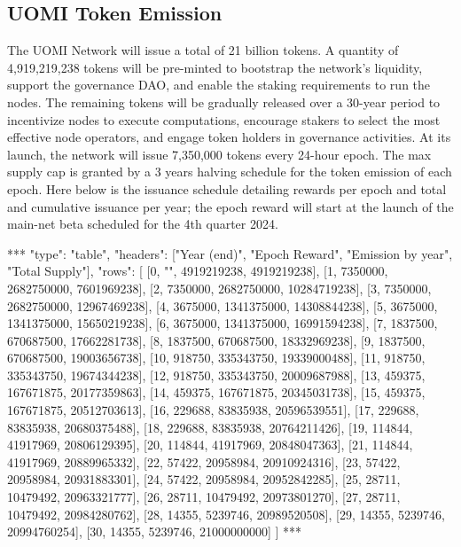 \documentclass{article}
\begin{document}
\subsection{UOMI Token Emission}

The UOMI Network will issue a total of 21 billion tokens. A quantity of 4,919,219,238 tokens will be pre-minted to bootstrap the network’s liquidity, support the governance DAO, and enable the staking requirements to run the nodes. The remaining tokens will be gradually released over a 30-year period to incentivize nodes to execute computations, encourage stakers to select the most effective node operators, and engage token holders in governance activities. At its launch, the network will issue 7,350,000 tokens every 24-hour epoch. The max supply cap is granted by a 3 years halving schedule for the token emission of each epoch. Here below is the issuance schedule detailing rewards per epoch and total and cumulative issuance per year; the epoch reward will start at the launch of the main-net beta scheduled for the 4th quarter 2024.

\begin{center}
***
"type": "table",
"headers": ["Year (end)", "Epoch Reward", "Emission by year", "Total Supply"],
"rows": [
  [0, "", 4919219238, 4919219238],
  [1, 7350000, 2682750000, 7601969238],
  [2, 7350000, 2682750000, 10284719238],
  [3, 7350000, 2682750000, 12967469238],
  [4, 3675000, 1341375000, 14308844238],
  [5, 3675000, 1341375000, 15650219238],
  [6, 3675000, 1341375000, 16991594238],
  [7, 1837500, 670687500, 17662281738],
  [8, 1837500, 670687500, 18332969238],
  [9, 1837500, 670687500, 19003656738],
  [10, 918750, 335343750, 19339000488],
  [11, 918750, 335343750, 19674344238],
  [12, 918750, 335343750, 20009687988],
  [13, 459375, 167671875, 20177359863],
  [14, 459375, 167671875, 20345031738],
  [15, 459375, 167671875, 20512703613],
  [16, 229688, 83835938, 20596539551],
  [17, 229688, 83835938, 20680375488],
  [18, 229688, 83835938, 20764211426],
  [19, 114844, 41917969, 20806129395],
  [20, 114844, 41917969, 20848047363],
  [21, 114844, 41917969, 20889965332],
  [22, 57422, 20958984, 20910924316],
  [23, 57422, 20958984, 20931883301],
  [24, 57422, 20958984, 20952842285],
  [25, 28711, 10479492, 20963321777],
  [26, 28711, 10479492, 20973801270],
  [27, 28711, 10479492, 20984280762],
  [28, 14355, 5239746, 20989520508],
  [29, 14355, 5239746, 20994760254],
  [30, 14355, 5239746, 21000000000]
]
***
\end{center}
\end{document}
